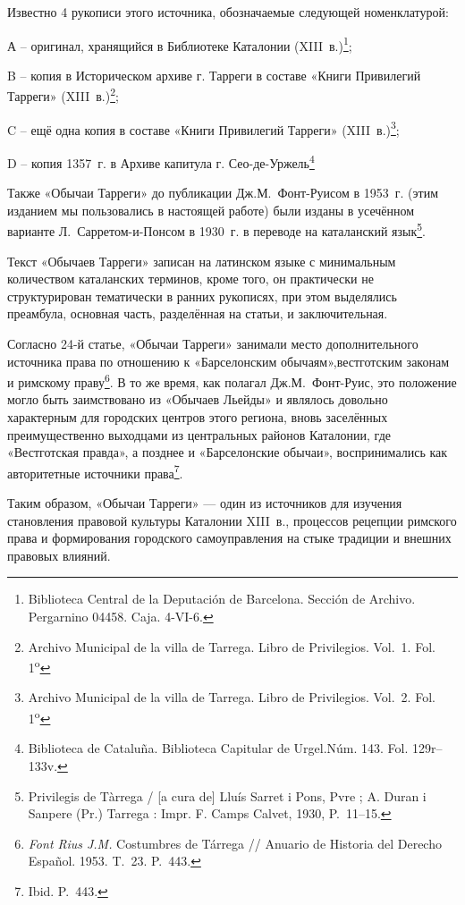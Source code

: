 Известно 4 рукописи этого источника, обозначаемые следующей номенклатурой:

А -- оригинал, хранящийся в Библиотеке Каталонии (XIII~в.)\footnote{Biblioteca Central de la Deputación de Barcelona. Sección de Archivo. Pergarnino 04458. Caja. 4-VI-6.};

B -- копия в Историческом архиве г. Тарреги в составе «Книги Привилегий Тарреги» (XIII~в.)\footnote{Archivo Municipal de la villa de Tarrega. Libro de Privilegios. Vol.~1. Fol. 1\textsuperscript{o}};

C -- ещё одна копия в составе «Книги Привилегий Тарреги» (XIII~в.)\footnote{Archivo Municipal de la villa de Tarrega. Libro de Privilegios. Vol.~2. Fol. 1\textsuperscript{o}};

D -- копия 1357~г. в Архиве капитула г. Сео-де-Уржель\footnote{Biblioteca de Cataluña. Biblioteca Capitular de Urgel.Núm. 143. Fol. 129r--133v.}

Также «Обычаи Тарреги» до публикации Дж.М.~Фонт-Руисом в 1953~г. (этим изданием мы пользовались в настоящей работе) были изданы в усечённом варианте Л.~Сарретом-и-Понсом в 1930~г. в переводе на каталанский язык\footnote{Privilegis de Tàrrega / [a cura de] Lluís Sarret i Pons, Pvre ; A. Duran i Sanpere (Pr.) Tarrega : Impr. F. Camps Calvet, 1930, P.~11--15.}.

Текст «Обычаев Тарреги» записан на латинском языке с минимальным количеством каталанских терминов, кроме того, он практически не структурирован тематически в ранних рукописях, при этом выделялись преамбула, основная часть, разделённая на статьи, и заключительная.

Согласно 24-й статье, «Обычаи Тарреги» занимали место дополнительного источника права по отношению к «Барселонским обычаям»,вестготским законам и римскому праву\footnote{\emph{Font Rius J.M. }Costumbres de Tárrega // Anuario de Historia del Derecho Español. 1953. T.~23. P.~443.}. В то же время, как полагал Дж.М.~Фонт-Руис, это положение могло быть заимствовано из «Обычаев Льейды» и являлось довольно характерным для городских центров этого региона, вновь заселённых преимущественно выходцами из центральных районов Каталонии, где «Вестготская правда», а позднее и «Барселонские обычаи», воспринимались как авторитетные источники права\footnote{Ibid. P.~443.}.

Таким образом, «Обычаи Тарреги» --- один из источников для изучения становления правовой культуры Каталонии XIII~в., процессов рецепции римского права и формирования городского самоуправления на стыке традиции и внешних правовых влияний.

